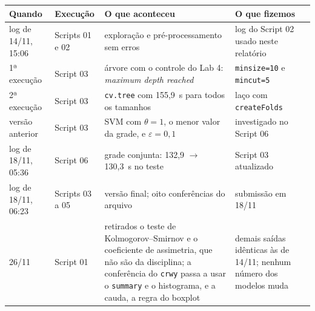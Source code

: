 \documentclass[12pt,a4paper]{article}
\begin{document}
\begin{table}[H]\centering\footnotesize
\begin{tabular}{p{2.6cm}p{2.4cm}p{5.0cm}p{3.7cm}}
\toprule
Quando & Execução & O que aconteceu & O que fizemos\\
\midrule
log de 14/11, 15:06 & Scripts 01 e 02 & exploração e pré-processamento sem erros & log do Script 02 usado neste relatório\\
1ª execução & Script 03 & árvore com o controle do Lab 4: \textit{maximum depth reached} & \texttt{minsize=10} e \texttt{mincut=5}\\
2ª execução & Script 03 & \texttt{cv.tree} com 155,9~s para todos os tamanhos & laço com \texttt{createFolds}\\
versão anterior & Script 03 & SVM com $\theta=1$, o menor valor da grade, e $\varepsilon=0{,}1$ & investigado no Script 06\\
log de 18/11, 05:36 & Script 06 & grade conjunta: 132,9 $\rightarrow$ 130,3~s no teste & Script 03 atualizado\\
log de 18/11, 06:23 & Scripts 03 a 05 & versão final; oito conferências do arquivo & submissão em 18/11\\
26/11 & Script 01 & retirados o teste de Kolmogorov--Smirnov e o coeficiente de assimetria, que não são da disciplina; a conferência do \texttt{crwy} passa a usar o \texttt{summary} e o histograma, e a cauda, a regra do boxplot & demais saídas idênticas às de 14/11; nenhum número dos modelos muda\\
\bottomrule
\end{tabular}
\end{table}
\end{document}
